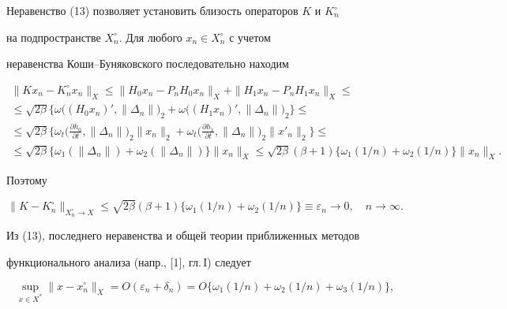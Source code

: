  


Неравенство (13) позволяет установить близость операторов $K$ и $K^\circ_n$ 


на подпространстве $X^\circ_n$. Для любого $x_n\in X^\circ_n$ с учетом 


неравенства Коши--Буняковского последовательно находим 


\begin{gather*} 


\|K x_n-K^\circ_n x_n\|_X\le\|H_0x_n-P_n H_0x_n\|_X+ 


\|H_1x_n-P_n H_1x_n\|_X\le \\ 


% 


\le\sqrt{2\beta}\big\{\omega\big((H_0x_n)',\|\Delta_n\|\big)_2+ 


\omega\big((H_1x_n)',\|\Delta_n\|\big)_2\big\}\le \\ 


% 


\le\sqrt{2\beta}\bigg\{\omega_t\bigg(\frac{\partial h_0}{\partial t}, 


\|\Delta_n\|\bigg)_2\|x_n\|_2+\omega_t\bigg( 


\frac{\partial h_1}{\partial t},\|\Delta_n\|\bigg)_2 


\|x'_n\|_2\bigg\}\le \\ 


% 


\le\sqrt{2\beta}\{\omega_1(\|\Delta_n\|)+\omega_2(\|\Delta_n\|)\} 


\|x_n\|_X\le\sqrt{2\beta}(\beta+1)\{\omega_1(1/n)+\omega_2(1/n)\} 


\|x_n\|_X. 


\end{gather*} 


Поэтому 


$$ 


\|K-K^\circ_n\|_{X^\circ_n\to X}\le\sqrt{2\beta}(\beta+1) 


\{\omega_1(1/n)+\omega_2(1/n)\}\equiv\varepsilon_n\to0,\quad 


n\to\infty. 


$$ 


Из (13), последнего неравенства и общей теории приближенных методов 


функционального анализа (напр., [1], гл.\,I) следует 


\begin{equation} 


\sup_{x\in X^*}\|x-x^\circ_n\|_X=O(\varepsilon_n+\delta_n)= 


O\{\omega_1(1/n)+\omega_2(1/n)+\omega_3(1/n)\}, 


\end{equation} 



